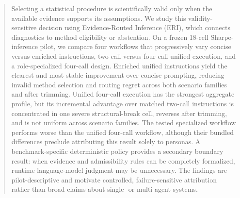 \begin{abstract}
Selecting a statistical procedure is scientifically valid only when the
available evidence supports its assumptions.  We study this validity-sensitive
decision using Evidence-Routed Inference (ERI), which connects diagnostics to
method eligibility or abstention.  On a frozen 18-cell Sharpe-inference pilot,
we compare four workflows that progressively vary concise versus enriched
instructions, two-call versus four-call unified execution, and a
role-specialized four-call design.  Enriched unified instructions yield the
clearest and most stable improvement over concise prompting, reducing invalid
method selection and routing regret across both scenario families and after
trimming.  Unified four-call execution has the strongest aggregate profile,
but its incremental advantage over matched two-call instructions is
concentrated in one severe structural-break cell, reverses after trimming, and
is not uniform across scenario families.  The tested specialized workflow
performs worse than the unified four-call workflow, although their bundled
differences preclude attributing this result solely to personas.  A
benchmark-specific deterministic policy provides a secondary boundary result:
when evidence and admissibility rules can be completely formalized, runtime
language-model judgment may be unnecessary.  The findings are
pilot-descriptive and motivate controlled, failure-sensitive attribution
rather than broad claims about single- or multi-agent systems.
\end{abstract}
